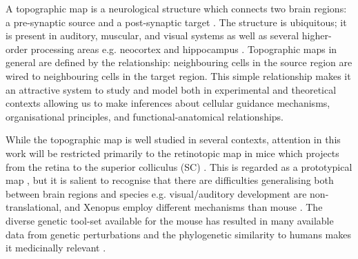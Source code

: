 A topographic map is a neurological structure which connects two brain regions: a pre-synaptic source and a post-synaptic target \cite{Udin1988-by}. The structure is ubiquitous; it is present in auditory, muscular, and visual systems as well as several higher-order processing areas e.g. neocortex and hippocampus  \cite{Jbabdi2013-np, McLaughlin2005-jd, Flanagan2006-fc, Huberman2008-zw}. Topographic maps in general are defined by the relationship: neighbouring cells in the source region are wired to neighbouring cells in the target region. This simple relationship makes it an attractive system to study and model both in experimental and theoretical contexts allowing us to make inferences about cellular guidance mechanisms, organisational principles, and functional-anatomical relationships.

While the topographic map is well studied in several contexts, attention in this work will be restricted primarily to the retinotopic map in mice which projects from the retina to the superior colliculus (SC) \cite{Kita2015-gc, Gattass2005-br, De_Long1965-dd, Sakaguchi1985-la, Cang2013-dw, McLaughlin2005-jd}. This is regarded as a prototypical map \cite{Ito2018-ef, Seabrook2017-fa}, but it is salient to recognise that there are difficulties generalising both between brain regions and species e.g. visual/auditory development are non-translational, and Xenopus employ different mechanisms than mouse \cite{Udin1988-by, McLaughlin2005-jd}. The diverse genetic tool-set available for the mouse has resulted in many available data from genetic perturbations and the phylogenetic similarity to humans makes it medicinally relevant \cite{Seabrook2017-fa}.

